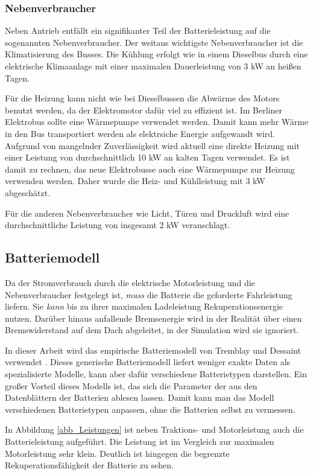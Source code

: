 \subsubsection{Nebenverbraucher}
Neben Antrieb entfällt ein signifikanter Teil der Batterieleistung auf die sogenannten Nebenverbraucher. Der weitaus wichtigste Nebenverbraucher ist die Klimatisierung des Busses. Die Kühlung erfolgt wie in einem Dieselbus durch eine elektrische Klimaanlage mit einer maximalen Dauerleistung von 3 kW an heißen Tagen.

Für die Heizung kann nicht wie bei Dieselbussen die Abwärme des Motors benutzt werden, da der Elektromotor dafür viel zu effizient ist. Im Berliner Elektrobus sollte eine Wärmepumpe verwendet werden. Damit kann mehr Wärme in den Bus transportiert werden als elektrsiche Energie aufgewandt wird. Aufgrund von mangelnder Zuverlässigkeit wird aktuell eine direkte Heizung mit einer Leistung von durchschnittlich 10 kW an kalten Tagen verwendet. Es ist damit zu rechnen, das neue Elektrobusse auch eine Wärmepumpe zur Heizung verwenden werden. Daher wurde die Heiz- und Kühlleistung mit 3 kW abgeschätzt.

Für die anderen Nebenverbraucher wie Licht, Türen und Druckluft wird eine durchschnittliche Leistung von insgesamt 2 kW veranschlagt.

\subsection{Batteriemodell}
Da der Stromverbrauch durch die elektrische Motorleistung und die Nebenverbraucher festgelegt ist, \emph{muss} die Batterie die geforderte Fahrleistung liefern. Sie \emph{kann} bis zu ihrer maximalen Ladeleistung Rekuperationsenergie nutzen. Darüber hinaus anfallende Bremsenergie wird in der Realität über einen Bremswiderstand auf dem Dach abgeleitet, in der Simulation wird sie ignoriert.

In dieser Arbeit wird das empirische Batteriemodell von Tremblay und Dessaint verwendet \cite{tremblay2009experimental}. Dieses generische Batteriemodell liefert weniger exakte Daten als spezialisierte Modelle, kann aber dafür verschiedene Batterietypen darstellen. Ein großer Vorteil dieses Modells ist, das sich die Parameter der aus den Datenblättern der Batterien ablesen lassen. Damit kann man das Modell verschiedenen Batterietypen anpassen, ohne die Batterien selbst zu vermessen.

In Abbildung \ref{abb_Leistungen} ist neben Traktions- und Motorleistung auch die Batterieleistung aufgeführt. Die Leistung ist im Vergleich zur maximalen Motorleistung sehr klein. Deutlich ist hingegen die begrenzte Rekuperationsfähigkeit der Batterie zu sehen.

